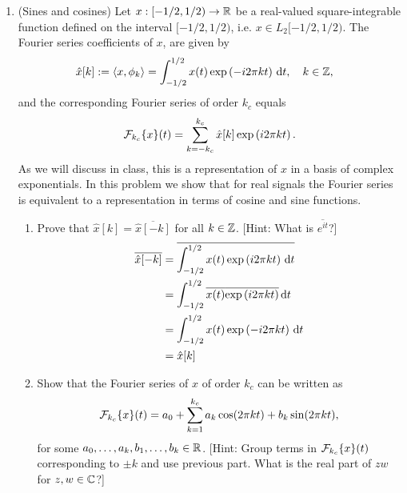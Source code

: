\documentclass[12pt,twoside]{article}
\begin{document}
\begin{enumerate}
 \item (Sines and cosines)
  Let $x:[-1/2,1/2)\to\mathbb{R} $ be a real-valued square-integrable function defined on the interval $[-1/2,1/2)$, i.e. $x\in L_2[-1/2,1/2)$. The Fourier series coefficients of $x$, are given by
\begin{align}
\hat{x}[k] & :=  \left \langle x, \phi_k\right \rangle = \int_{-1/2}^{1/2} x(t) \exp \left( - i2 \pi k t \right)  \, \text{d}t, \quad k \in \mathbb{Z},
\end{align}
and the corresponding Fourier series of order $k_c$ equals
\begin{align}
\mathcal{ F }_{k_c}\{x\}(t) = \sum_{k=-k_c}^{k_c} \hat{x}[k] \exp \left( i 2 \pi k t \right).
\end{align}
As we will discuss in class, this is a representation of $x$ in a basis of complex exponentials. In this problem we show that for real signals the Fourier series is equivalent to a representation in terms of cosine and sine functions.
  \begin{enumerate}
  \item Prove that $\hat{x}[k]=\overline{\hat{x}[-k]}$
    for all $k\in\mathbb{Z}$. [Hint: What is $\overline{e^{it}}$?]\\
    \begin{align*}
    	\overline{\hat{x}[-k]} 	&= 	\overline{  \int_{-1/2}^{1/2} x(t) \exp \left(  i 2 \pi k t \right)  \, \text{d}t } \\
					&=	 \int_{-1/2}^{1/2} \overline{x(t)} \overline{ \exp \left(  i2 \pi k t \right) } \, \text{d}t \\
					&=	 \int_{-1/2}^{1/2} x(t)  \exp \left(  -i 2 \pi k t \right) \, \text{d}t \\
					&= 	 \hat{x}[k] \\
    \end{align*}
    
    
  \item Show that the Fourier series of $x$ of order $k_c$ can be written as
    $$\mathcal{ F }_{k_c}\{x\}(t) = a_0 + \sum_{k=1}^{k_c} a_k\cos(2\pi
    kt)+b_k\sin(2\pi kt),$$
    for some $a_0,\ldots,a_k,b_1,\ldots,b_k\in\mathbb{R}$. [Hint: Group terms
      in $\mathcal{ F }_{k_c}\{x\}(t)$ corresponding to $\pm k$ and use previous
      part.  What is the real part of $zw$ for $z,w\in\mathbb{C} $?]
      

\end{enumerate}
\end{enumerate}
\end{document}
